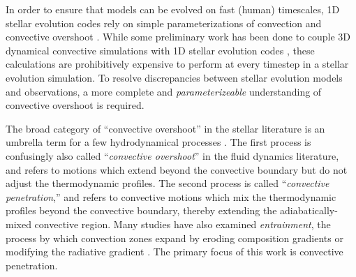 \documentclass[twocolumn]{aastex631}
\begin{document}
In order to ensure that models can be evolved on fast (human) timescales, 1D stellar evolution codes rely on simple parameterizations of convection \citep[e.g., mixing length theory,][]{bohm-vitense1958} and convective overshoot \citep{shaviv_salpeter_1973, maeder1975, herwig2000, paxton_etal_2011, paxton_etal_2013, paxton_etal_2018, paxton_etal_2019}.
While some preliminary work has been done to couple 3D dynamical convective simulations with 1D stellar evolution codes \citep{jorgensen_weiss_2019}, these calculations are prohibitively expensive to perform at every timestep in a stellar evolution simulation.
To resolve discrepancies between stellar evolution models and observations, a more complete and \emph{parameterizeable} understanding of convective overshoot is required.

The broad category of ``convective overshoot'' in the stellar literature is an umbrella term for a few hydrodynamical processes \citep{zahn1991, brummell_etal_2002, korre_etal_2019}.
The first process is confusingly also called ``\emph{convective overshoot}'' in the fluid dynamics literature, and refers to motions which extend beyond the convective boundary but do not adjust the thermodynamic profiles.
The second process is called ``\emph{convective penetration},'' and refers to convective motions which mix the thermodynamic profiles beyond the convective boundary, thereby extending the adiabatically-mixed convective region.
Many studies have also examined \emph{entrainment}, the process by which convection zones expand by eroding composition gradients or modifying the radiative gradient \citep[][]{meakin_arnett_2007, viallet_etal_2013, cristini_etal_2017, fuentes_cumming_2020, horst_etal_2021}.
The primary focus of this work is convective penetration.
\end{document}
